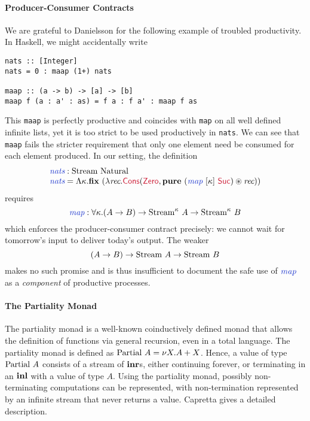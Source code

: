 \paragraph{Producer-Consumer Contracts} We are grateful to Danielsson
for the following example of troubled productivity. In Haskell, we
might accidentally write
\begin{verbatim}
nats :: [Integer]
nats = 0 : maap (1+) nats

maap :: (a -> b) -> [a] -> [b]
maap f (a : a' : as) = f a : f a' : maap f as
\end{verbatim}
This \texttt{maap} is perfectly productive and coincides with
\texttt{map} on all well defined infinite lists, yet it is too strict 
to be used productively in \texttt{nats}. We can see that
\texttt{maap} fails the stricter requirement that only one element
need be consumed for each element produced. In our setting, the
definition
\begin{displaymath}
  \begin{array}{l}
    \defn{nats} : \tyname{Stream}~\tyname{Natural} \\
    \defn{nats} = \Lambda \kappa. \kw{fix}~(\lambda \ident{rec}.
      \cons{Cons}(\cons{Zero},\kw{pure}~(\defn{map}~[\kappa]~\cons{Suc})
      \circledast \ident{rec}))
  \end{array}
\end{displaymath}
requires
\begin{displaymath}
    \defn{map} : \forall \kappa.(A\to B)\to\tyname{Stream}^\kappa~A\to\tyname{Stream}^\kappa~B
\end{displaymath}
which enforces the producer-consumer contract precisely: we cannot
wait for tomorrow's input to deliver today's output. The weaker
\begin{displaymath}
   (A\to B)\to\textrm{Stream}~A\to\textrm{Stream}~B
\end{displaymath}
makes no such promise and is thus insufficient to document the
safe use of $\defn{map}$ as a \emph{component} of productive processes.


\paragraph{The Partiality Monad} The partiality monad is a well-known
coinductively defined monad that allows the definition of functions
via general recursion, even in a total language. The partiality monad
is defined as $\textrm{Partial}~A = \nu X. A + X$. Hence, a value of
type $\textrm{Partial}~A$ consists of a stream of $\textbf{inr}$s, either
continuing forever, or terminating in an $\textbf{inl}$ with a value of
type $A$. Using the partiality monad, possibly non-terminating
computations can be represented, with non-termination represented by
an infinite stream that never returns a value. Capretta
\cite{capretta05general} gives a detailed description.

